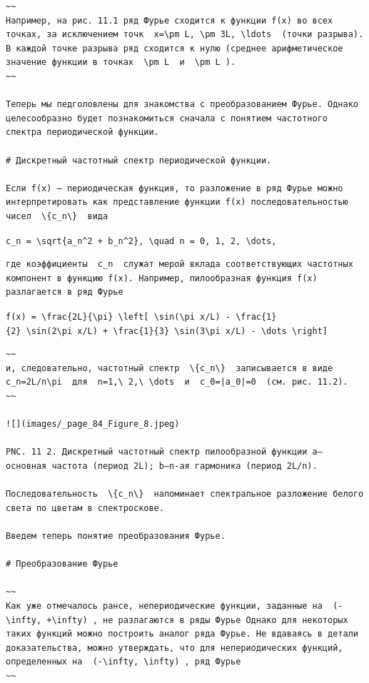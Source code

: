 \documentclass[
  ukrainian,
]{article}
\begin{document}
\begin{verbatim}
~~
Например, на рис. 11.1 ряд Фурье сходится к функции f(x) во всех точках, за исключением точк  x=\pm L, \pm 3L, \ldots  (точки разрыва). В каждой точке разрыва ряд сходится к нулю (среднее арифметическое значение функции в точках  \pm L  и  \pm L ).
~~

Теперь мы педголовлены для знакомства с преобразованием Фурье. Однако целесообразно будет познакомиться сначала с понятием частотного спектра периодической функции.

# Дискретный частотный спектр периодической функции.

Если f(x) — периодическая функция, то разложение в ряд Фурье можно интерпретировать как представление функции f(x) последовательностью чисел  \{c_n\}  вида
\end{verbatim}

\texttt{c\_n\ =\ \textbackslash{}sqrt\{a\_n\^{}2\ +\ b\_n\^{}2\},\ \textbackslash{}quad\ n\ =\ 0,\ 1,\ 2,\ \textbackslash{}dots,}

\begin{verbatim}
где коэффициенты  c_n  служат мерой вклада соответствующих частотных компонент в функцию f(x). Например, пилообразная функция f(x) разлагается в ряд Фурье
\end{verbatim}

\texttt{f(x)\ =\ \textbackslash{}frac\{2L\}\{\textbackslash{}pi\}\ \textbackslash{}left{[}\ \textbackslash{}sin(\textbackslash{}pi\ x/L)\ -\ \textbackslash{}frac\{1\}\{2\}\ \textbackslash{}sin(2\textbackslash{}pi\ x/L)\ +\ \textbackslash{}frac\{1\}\{3\}\ \textbackslash{}sin(3\textbackslash{}pi\ x/L)\ -\ \textbackslash{}dots\ \textbackslash{}right{]}}

\begin{verbatim}
~~
и, следовательно, частотный спектр  \{c_n\}  записывается в виде  c_n=2L/n\pi  для  n=1,\ 2,\ \dots  и  c_0=|a_0|=0  (см. рис. 11.2).
~~

![](images/_page_84_Figure_8.jpeg)

PNC. 11 2. Дискретный частотный спектр пилообразной функции a— основная частота (период 2L); b—n-ая гармоника (период 2L/n).

Последовательность  \{c_n\}  напоминает спектральное разложение белого света по цветам в спектроскове.

Введем теперь понятие преобразования Фурье.

# Преобразование Фурье

~~
Как уже отмечалось рансе, непериодические функции, заданные на  (-\infty, +\infty) , не разлагаются в ряды Фурье Однако для некоторых таких функций можно построить аналог ряда Фурье. Не вдаваясь в детали доказательства, можно утверждать, что для непериодических функций, определенных на  (-\infty, \infty) , ряд Фурье
~~
\end{verbatim}
\end{document}
